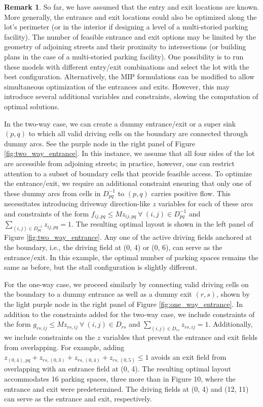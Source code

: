\documentclass[10pt]{article}
\newcommand{\flowvar}[4]{f_{#1#2,#3#4}}
\newcommand{\flowvardash}[4]{g_{#1#2,#3#4}}
\newcommand{\countvar}[4]{z_{#1#2,#3#4}}
\newcommand{\gridadjset}[2]{D_{#1#2}}
\newcommand{\gridinvadjset}[2]{D^{-1}_{#1#2}}
\newcommand{\entrancex}{p}
\newcommand{\entrancey}{q}
\theoremstyle{definition}
\newtheorem{remark}{Remark}
\begin{document}
\begin{remark}
So far, we have assumed that the entry and exit locations are known. More generally, the entrance and exit locations could also be optimized along the lot's perimeter (or in the interior if designing a level of a multi-storied parking facility). The number of feasible entrance and exit options may be limited by the geometry of adjoining streets and their proximity to intersections (or building plans in the case of a multi-storied parking facility). One possibility is to run these models with different entry/exit combinations and select the lot with the best configuration. Alternatively, the MIP formulations can be modified to allow simultaneous optimization of the entrances and exits. However, this may introduce several additional variables and constraints, slowing the computation of optimal solutions.  

In the two-way case, we can create a dummy entrance/exit or a super sink $(\entrancex, \entrancey)$ to which all valid driving cells on the boundary are connected through dummy arcs. See the purple node in the right panel of Figure \ref{fig:two_way_entrance}. In this instance, we assume that all four sides of the lot are accessible from adjoining streets; in practice, however, one can restrict attention to a subset of boundary cells that provide feasible access. To optimize the entrance/exit, we require an additional constraint ensuring that only one of these dummy arcs from cells in $\gridinvadjset{p}{q}$ to $(\entrancex, \entrancey)$ carries positive flow. This necessitates introducing driveway direction-like $z$ variables for each of these arcs and constraints of the form $\flowvar{i}{j}{p}{q} \leq M \countvar{i}{j}{p}{q}~\forall~(i, j) \in \gridinvadjset{p}{q}$ and $\sum_{(i, j) \in \gridinvadjset{p}{q}} \countvar{i}{j}{p}{q} = 1$. The resulting optimal layout is shown in the left panel of Figure \ref{fig:two_way_entrance}. Any one of the active driving fields anchored at the boundary, i.e., the driving field at (0, 4) or (0, 6), can serve as the entrance/exit. In this example, the optimal number of parking spaces remains the same as before, but the stall configuration is slightly different.

For the one-way case, we proceed similarly by connecting valid driving cells on the boundary to a dummy entrance as well as a dummy exit $(r,s)$, shown by the light purple node in the right panel of Figure \ref{fig:one_way_entrance}. In addition to the constraints added for the two-way case, we include constraints of the form $\flowvardash{r}{s}{i}{j} \leq M \countvar{r}{s}{i}{j}~\forall~(i,j) \in \gridadjset{r}{s}$ and $\sum_{(i, j) \in \gridadjset{r}{s}} \countvar{r}{s}{i}{j} = 1$. Additionally, we include constraints on the $z$ variables that prevent the entrance and exit fields from overlapping. For example, adding $\countvar{(0,}{4)}{p}{q} + \countvar{r}{s}{(0,}{3)} + \countvar{r}{s}{(0,}{4)} + \countvar{r}{s}{(0,}{5)} \leq 1$ avoids an exit field from overlapping with an entrance field at (0, 4). The resulting optimal layout accommodates 16 parking spaces, three more than in Figure 10, where the entrance and exit were predetermined. The driving fields at (0, 4) and (12, 11) can serve as the entrance and exit, respectively.


\end{remark}
\end{document}
